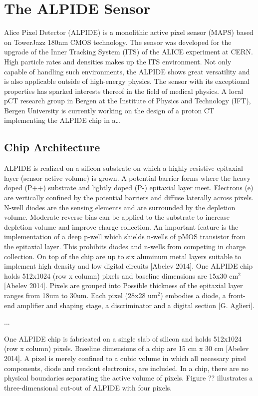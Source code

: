 \chapter{The ALPIDE Sensor}

Alice Pixel Detector (ALPIDE) is a monolithic active pixel sensor (MAPS) based on TowerJazz 180nm CMOS technology. The sensor was developed for the upgrade of the Inner Tracking System (ITS) of the ALICE experiment at CERN. High particle rates and densities makes up the ITS environment. Not only capable of handling such environments, the ALPIDE shows great versatility and is also applicable outside of high-energy physics.
The sensor with its exceptional properties has sparked interests thereof in the field of medical physics. A local pCT research group in Bergen at the Institute of Physics and Technology (IFT), Bergen University is currently working on the design of a proton CT implementing the ALPIDE chip in a…

\section{Chip Architecture}
ALPIDE is realized on a silicon substrate on which a highly resistive epitaxial layer (sensor active volume) is grown. A potential barrier forms where the heavy doped (P++) substrate and lightly doped (P-) epitaxial layer meet. Electrons (e) are vertically confined by the potential barriers and diffuse laterally across pixels. N-well diodes are the sensing elements and are surrounded by the depletion volume. Moderate reverse bias can be applied to the substrate to increase depletion volume and improve charge collection.
An important feature is the implementation of a deep p-well which shields n-wells of pMOS transistor from the epitaxial layer. This prohibits diodes and n-wells from competing in charge collection.
On top of the chip are up to six aluminum metal layers suitable to implement high density and low digital circuits [Abelev 2014].
One ALPIDE chip holds 512x1024 (row x column) pixels and baseline dimensions are 15x30 cm$^2$ [Abelev 2014]. Pixels are grouped into
Possible thickness of the epitaxial layer ranges from 18um to 30um. Each pixel (28x28 um$^2$) embodies a diode, a front-end amplifier and shaping stage, a discriminator and a digital section [G. Aglieri].



...



One ALPIDE chip is fabricated on a single slab of silicon and holds 512x1024 (row x column) pixels. Baseline dimensions of a chip are 15 cm x 30 cm [Abelev 2014]. A pixel is merely confined to a cubic volume in which all necessary pixel components, diode and readout electronics, are included. In a chip, there are no physical boundaries separating the active volume of pixels. Figure ?? illustrates a three-dimensional cut-out of ALPIDE with four pixels.

